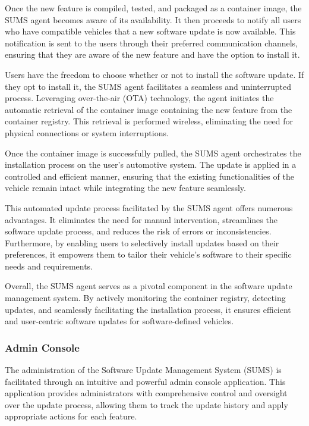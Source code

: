 \documentclass[
12pt,
oneside, 
onehalfspacing, 
nolistspacing, 
parskip, 
chapterinoneline, 
]{AASTCOMPUTER}
\begin{document}
Once the new feature is compiled, tested, and packaged as a container image, the SUMS agent becomes aware of its availability. It then proceeds to notify all users who have compatible vehicles that a new software update is now available. This notification is sent to the users through their preferred communication channels, ensuring that they are aware of the new feature and have the option to install it.

Users have the freedom to choose whether or not to install the software update. If they opt to install it, the SUMS agent facilitates a seamless and uninterrupted process. Leveraging over-the-air (OTA) technology, the agent initiates the automatic retrieval of the container image containing the new feature from the container registry. This retrieval is performed wireless, eliminating the need for physical connections or system interruptions.

Once the container image is successfully pulled, the SUMS agent orchestrates the installation process on the user's automotive system. The update is applied in a controlled and efficient manner, ensuring that the existing functionalities of the vehicle remain intact while integrating the new feature seamlessly.

This automated update process facilitated by the SUMS agent offers numerous advantages. It eliminates the need for manual intervention, streamlines the software update process, and reduces the risk of errors or inconsistencies. Furthermore, by enabling users to selectively install updates based on their preferences, it empowers them to tailor their vehicle's software to their specific needs and requirements.

Overall, the SUMS agent serves as a pivotal component in the software update management system. By actively monitoring the container registry, detecting updates, and seamlessly facilitating the installation process, it ensures efficient and user-centric software updates for software-defined vehicles.

\subsubsection{Admin Console}
The administration of the Software Update Management System (SUMS) is facilitated through an intuitive and powerful admin console application. This application provides administrators with comprehensive control and oversight over the update process, allowing them to track the update history and apply appropriate actions for each feature.
\end{document}

